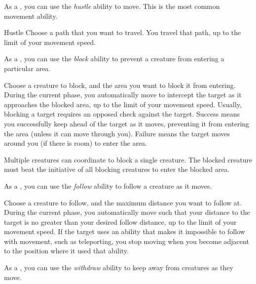          As a , you can use the \textit{hustle} ability to move.
        This is the most common movement ability.

        \begin{freeability}{Hustle}
            Choose a path that you want to travel. You travel that path, up to the limit of your movement speed.
        \end{freeability}

         As a , you can use the \textit{block} ability to prevent a creature from entering a particular area.

        \begin{freeability}{}
            Choose a creature to block, and the area you want to block it from entering.
            During the current phase, you automatically move to intercept the target as it approaches the blocked area, up to the limit of your movement speed.
            Usually, blocking a target requires an opposed  check against the target.
            Success means you successfully keep ahead of the target as it moves, preventing it from entering the area (unless it can move through you).
            Failure means the target moves around you (if there is room) to enter the area.

            Multiple creatures can coordinate to block a single creature.
            The blocked creature must beat the initiative of all blocking creatures to enter the blocked area.
        \end{freeability}

         As a , you can use the \textit{follow} ability to follow a creature as it moves.

        \begin{freeability}{}
            Choose a creature to follow, and the maximum distance you want to follow at.
            During the current phase, you automatically move such that your distance to the target is no greater than your desired follow distance, up to the limit of your movement speed.
            If the target uses an ability that makes it impossible to follow with movement, such as teleporting, you stop moving when you become adjacent to the position where it used that ability.
        \end{freeability}

         As a , you can use the \textit{withdraw} ability to keep away from creatures as they move.

